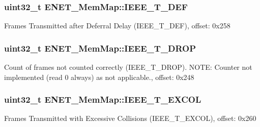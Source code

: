 \subsubsection[{I\+E\+E\+E\+\_\+\+T\+\_\+\+D\+E\+F}]{\setlength{\rightskip}{0pt plus 5cm}uint32\+\_\+t E\+N\+E\+T\+\_\+\+Mem\+Map\+::\+I\+E\+E\+E\+\_\+\+T\+\_\+\+D\+E\+F}\label{struct_e_n_e_t___mem_map_aafb1b9be07fdb0ed86bec13c6d12079d}
Frames Transmitted after Deferral Delay (I\+E\+E\+E\+\_\+\+T\+\_\+\+D\+E\+F), offset\+: 0x258 \hypertarget{struct_e_n_e_t___mem_map_abf2a729b70202f56ef30cdfd6488e6c0}{}
\subsubsection[{I\+E\+E\+E\+\_\+\+T\+\_\+\+D\+R\+O\+P}]{\setlength{\rightskip}{0pt plus 5cm}uint32\+\_\+t E\+N\+E\+T\+\_\+\+Mem\+Map\+::\+I\+E\+E\+E\+\_\+\+T\+\_\+\+D\+R\+O\+P}\label{struct_e_n_e_t___mem_map_abf2a729b70202f56ef30cdfd6488e6c0}
Count of frames not counted correctly (I\+E\+E\+E\+\_\+\+T\+\_\+\+D\+R\+O\+P). N\+O\+T\+E\+: Counter not implemented (read 0 always) as not applicable., offset\+: 0x248 \hypertarget{struct_e_n_e_t___mem_map_af146cbbe1695e4bdd737944140402505}{}
\subsubsection[{I\+E\+E\+E\+\_\+\+T\+\_\+\+E\+X\+C\+O\+L}]{\setlength{\rightskip}{0pt plus 5cm}uint32\+\_\+t E\+N\+E\+T\+\_\+\+Mem\+Map\+::\+I\+E\+E\+E\+\_\+\+T\+\_\+\+E\+X\+C\+O\+L}\label{struct_e_n_e_t___mem_map_af146cbbe1695e4bdd737944140402505}
Frames Transmitted with Excessive Collisions (I\+E\+E\+E\+\_\+\+T\+\_\+\+E\+X\+C\+O\+L), offset\+: 0x260 \hypertarget{struct_e_n_e_t___mem_map_adb62449a19466691f4143cb70d0f4ead}{}
